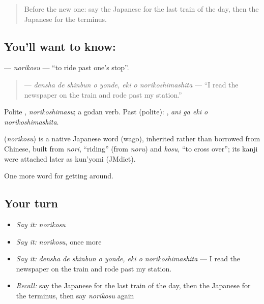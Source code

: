 \begin{quote}
Before the new one: say the Japanese for the last train of the day, then the Japanese for the terminus.
\end{quote}

\subsection*{You'll want to know: }
\textbf{} — \emph{norikosu} — \textquotedblleft{}to ride past one's stop\textquotedblright{}.

\begin{quote}
\textbf{   } — \emph{densha de shinbun o yonde, eki o norikoshimashita} — \textquotedblleft{}I read the newspaper on the train and rode past my station.\textquotedblright{}
\end{quote}

Polite \textbf{}, \emph{norikoshimasu}; a godan verb. Past (polite): \textbf{  }, \emph{ani ga eki o norikoshimashita}.

\begin{cousinweb}
\textbf{} (\emph{norikosu}) is a native Japanese word (wago), inherited rather than borrowed from Chinese, built from \emph{nori}, \textquotedblleft{}riding\textquotedblright{} (from \emph{noru}) and \emph{kosu}, \textquotedblleft{}to cross over\textquotedblright{}; its kanji were attached later as kun'yomi (JMdict).
\end{cousinweb}

\begin{grammarlens}[title={What you've built}]
One more word for getting around.
\end{grammarlens}

\subsection*{Your turn}
\begin{itemize}
\raggedright
  \item \emph{Say it:} \emph{norikosu}
  \item \emph{Say it:} \emph{norikosu}, once more
  \item \emph{Say it:} \emph{densha de shinbun o yonde, eki o norikoshimashita} — I read the newspaper on the train and rode past my station.
  \item \emph{Recall:} say the Japanese for the last train of the day, then the Japanese for the terminus, then say \emph{norikosu} again
\end{itemize}

